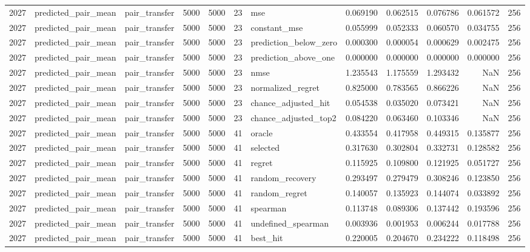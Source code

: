 \begin{tabular}{rllrrrlrrrrr}
2027 & predicted_pair_mean & pair_transfer & 5000 & 5000 & 23 & mse & 0.069190 & 0.062515 & 0.076786 & 0.061572 & 256 \\
2027 & predicted_pair_mean & pair_transfer & 5000 & 5000 & 23 & constant_mse & 0.055999 & 0.052333 & 0.060570 & 0.034755 & 256 \\
2027 & predicted_pair_mean & pair_transfer & 5000 & 5000 & 23 & prediction_below_zero & 0.000300 & 0.000054 & 0.000629 & 0.002475 & 256 \\
2027 & predicted_pair_mean & pair_transfer & 5000 & 5000 & 23 & prediction_above_one & 0.000000 & 0.000000 & 0.000000 & 0.000000 & 256 \\
2027 & predicted_pair_mean & pair_transfer & 5000 & 5000 & 23 & nmse & 1.235543 & 1.175559 & 1.293432 & NaN & 256 \\
2027 & predicted_pair_mean & pair_transfer & 5000 & 5000 & 23 & normalized_regret & 0.825000 & 0.783565 & 0.866226 & NaN & 256 \\
2027 & predicted_pair_mean & pair_transfer & 5000 & 5000 & 23 & chance_adjusted_hit & 0.054538 & 0.035020 & 0.073421 & NaN & 256 \\
2027 & predicted_pair_mean & pair_transfer & 5000 & 5000 & 23 & chance_adjusted_top2 & 0.084220 & 0.063460 & 0.103346 & NaN & 256 \\
2027 & predicted_pair_mean & pair_transfer & 5000 & 5000 & 41 & oracle & 0.433554 & 0.417958 & 0.449315 & 0.135877 & 256 \\
2027 & predicted_pair_mean & pair_transfer & 5000 & 5000 & 41 & selected & 0.317630 & 0.302804 & 0.332731 & 0.128582 & 256 \\
2027 & predicted_pair_mean & pair_transfer & 5000 & 5000 & 41 & regret & 0.115925 & 0.109800 & 0.121925 & 0.051727 & 256 \\
2027 & predicted_pair_mean & pair_transfer & 5000 & 5000 & 41 & random_recovery & 0.293497 & 0.279479 & 0.308246 & 0.123850 & 256 \\
2027 & predicted_pair_mean & pair_transfer & 5000 & 5000 & 41 & random_regret & 0.140057 & 0.135923 & 0.144074 & 0.033892 & 256 \\
2027 & predicted_pair_mean & pair_transfer & 5000 & 5000 & 41 & spearman & 0.113748 & 0.089306 & 0.137442 & 0.193596 & 256 \\
2027 & predicted_pair_mean & pair_transfer & 5000 & 5000 & 41 & undefined_spearman & 0.003936 & 0.001953 & 0.006244 & 0.017788 & 256 \\
2027 & predicted_pair_mean & pair_transfer & 5000 & 5000 & 41 & best_hit & 0.220005 & 0.204670 & 0.234222 & 0.118498 & 256 \\

\end{tabular}
